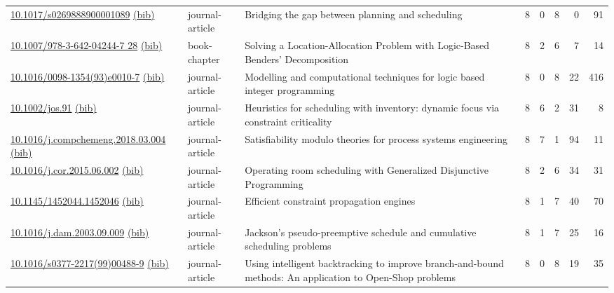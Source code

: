 {\begin{longtable}{p{5cm}lp{11cm}rrrrr}
\href{http://dx.doi.org/10.1017/s0269888900001089}{10.1017/s0269888900001089} \href{https://www.doi2bib.org/bib/10.1017/s0269888900001089}{(bib)} & journal-article & Bridging the gap between planning and scheduling & 8 & 0 & 8 & 0 & 91 \\
\href{http://dx.doi.org/10.1007/978-3-642-04244-7_28}{10.1007/978-3-642-04244-7 28} \href{https://www.doi2bib.org/bib/10.1007/978-3-642-04244-7_28}{(bib)} & book-chapter & Solving a Location-Allocation Problem with Logic-Based Benders' Decomposition & 8 & 2 & 6 & 7 & 14 \\
\href{http://dx.doi.org/10.1016/0098-1354(93)e0010-7}{10.1016/0098-1354(93)e0010-7} \href{https://www.doi2bib.org/bib/10.1016/0098-1354(93)e0010-7}{(bib)} & journal-article & Modelling and computational techniques for logic based integer programming & 8 & 0 & 8 & 22 & 416 \\
\href{http://dx.doi.org/10.1002/jos.91}{10.1002/jos.91} \href{https://www.doi2bib.org/bib/10.1002/jos.91}{(bib)} & journal-article & Heuristics for scheduling with inventory: dynamic focus via constraint criticality & 8 & 6 & 2 & 31 & 8 \\
\href{http://dx.doi.org/10.1016/j.compchemeng.2018.03.004}{10.1016/j.compchemeng.2018.03.004} \href{https://www.doi2bib.org/bib/10.1016/j.compchemeng.2018.03.004}{(bib)} & journal-article & Satisfiability modulo theories for process systems engineering & 8 & 7 & 1 & 94 & 11 \\
\href{http://dx.doi.org/10.1016/j.cor.2015.06.002}{10.1016/j.cor.2015.06.002} \href{https://www.doi2bib.org/bib/10.1016/j.cor.2015.06.002}{(bib)} & journal-article & Operating room scheduling with Generalized Disjunctive Programming & 8 & 2 & 6 & 34 & 31 \\
\href{http://dx.doi.org/10.1145/1452044.1452046}{10.1145/1452044.1452046} \href{https://www.doi2bib.org/bib/10.1145/1452044.1452046}{(bib)} & journal-article & Efficient constraint propagation engines & 8 & 1 & 7 & 40 & 70 \\
\href{http://dx.doi.org/10.1016/j.dam.2003.09.009}{10.1016/j.dam.2003.09.009} \href{https://www.doi2bib.org/bib/10.1016/j.dam.2003.09.009}{(bib)} & journal-article & Jackson's pseudo-preemptive schedule and cumulative scheduling problems & 8 & 1 & 7 & 25 & 16 \\
\href{http://dx.doi.org/10.1016/s0377-2217(99)00488-9}{10.1016/s0377-2217(99)00488-9} \href{https://www.doi2bib.org/bib/10.1016/s0377-2217(99)00488-9}{(bib)} & journal-article & Using intelligent backtracking to improve branch-and-bound methods: An application to Open-Shop problems & 8 & 0 & 8 & 19 & 35 \\

\end{longtable}}

